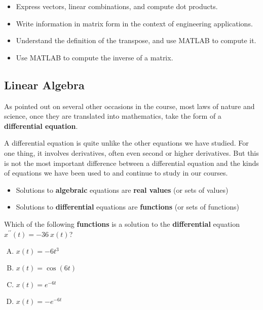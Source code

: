 \documentclass[12pt]{amsart}
\begin{document}
\newpage
\setfont
\pagestyle{fancy}
\renewcommand{\Week}{10}
\renewcommand{\WeekTitle}{\WeekTitleTen}

\fancyhead[LE,RO]{Week \Week}  %
\fancyfoot{}
\sectionbox{Week \#\Week: \WeekTitle}

\vspace{5mm}
\goals 
\begin{itemize}
\item Express vectors, linear combinations, and compute dot products.
\item Write information in matrix form in the context of engineering applications.
\item Understand the definition of the transpose, and use MATLAB to compute it.
\item Use MATLAB to compute the inverse of a matrix.
\end{itemize}

\newpage
{}
\subsection*{Linear Algebra}

As pointed out on several other occasions in the course, most laws
of nature and science, once they are translated into mathematics,
take the form of a {\bf differential equation}.

A differential equation is quite unlike the other equations we have
studied. For one thing, it involves derivatives, often even second
or higher derivatives.  But this is not the most important
difference between a differential equation and the kinds of
equations we have been used to and continue to study in our courses. 
\begin{itemize}
\item Solutions to {\bf algebraic} equations are {\bf real values} (or sets of values) \\[2ex]

\item Solutions to {\bf differential} equations are {\bf functions} (or sets of functions) \\[2ex]

\end{itemize}

\newpage
\begin{problem}
Which of the following {\bf functions} is a solution to the
{\bf differential} equation $x^{\prime\prime} (t) = - 36 ~x(t)$? \\[2ex]
\begin{enumerate}[A.]
\item $x(t)=-6 t^3$ \\[2ex]
\item $x(t)=\cos(6 t)$ \\[2ex]
\item $x(t)=e^{-6t}$ \\[2ex]
\item $x(t)=-e^{-6t}$
\end{enumerate}
\end{problem}
\bigskip
\end{document}
